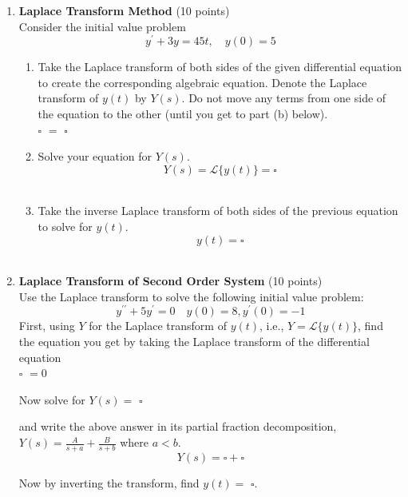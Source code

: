 \begin{enumerate}
  \item \textbf{Laplace Transform Method} (10 points)\\
  Consider the initial value problem
  $$
  y^{\prime}+3 y=45 t, \quad y(0)=5
  $$
  \begin{enumerate}[label=(\alph*)]
    \item Take the Laplace transform of both sides of the given differential equation to create the corresponding algebraic equation. Denote the Laplace transform of $y(t)$ by $Y(s)$. Do not move any terms from one side of the equation to the other (until you get to part (b) below).\\
    $\square$ $=$ $\square$\\
    \begin{subanswer}
    \end{subanswer}
    \item Solve your equation for $Y(s)$.\\
    $$
    Y(s)=\mathcal{L}\{y(t)\}=\square
    $$\\
    \begin{subanswer}
    \end{subanswer}
    \item Take the inverse Laplace transform of both sides of the previous equation to solve for $y(t)$.\\
    $$
    y(t)=\square
    $$\\
    \begin{subanswer}
    \end{subanswer}
  \end{enumerate}

  \item \textbf{Laplace Transform of Second Order System} (10 points)\\
  Use the Laplace transform to solve the following initial value problem:
  $$
  y^{\prime \prime}+5 y^{\prime}=0 \quad y(0)=8, y^{\prime}(0)=-1
  $$
  First, using $Y$ for the Laplace transform of $y(t)$, i.e., $Y=\mathcal{L}\{y(t)\}$, find the equation you get by taking the Laplace transform of the differential equation\\
  $\square$ $=0$\\
  \begin{subanswer}
  \end{subanswer}
  Now solve for $Y(s)=$ $\square$\\
  \begin{subanswer}
  \end{subanswer}
  and write the above answer in its partial fraction decomposition, $Y(s)=\frac{A}{s+a}+\frac{B}{s+b}$ where $a<b$.
  $$
  Y(s)=\square+\square
  $$
  \begin{subanswer}
  \end{subanswer}
  Now by inverting the transform, find $y(t)=$ $\square$.\\
  \begin{subanswer}
  \end{subanswer}


\end{enumerate}
